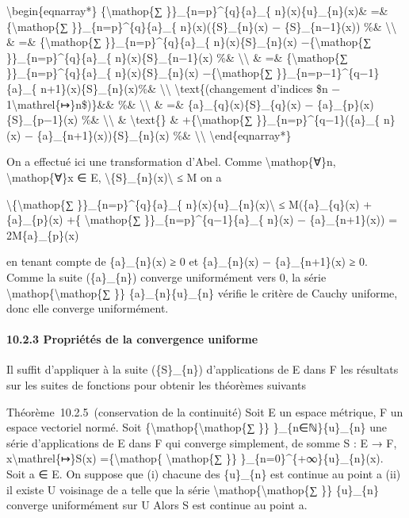 \documentclass[]{article}
\begin{document}
\textbackslash{}begin\{eqnarray*\} \{\textbackslash{}mathop\{∑
\}\}\_\{n=p\}\^{}\{q\}\{a\}\_\{ n\}(x)\{u\}\_\{n\}(x)\& =\&
\{\textbackslash{}mathop\{∑ \}\}\_\{n=p\}\^{}\{q\}\{a\}\_\{
n\}(x)(\{S\}\_\{n\}(x) − \{S\}\_\{n−1\}(x)) \%\&
\textbackslash{}\textbackslash{} \& =\& \{\textbackslash{}mathop\{∑
\}\}\_\{n=p\}\^{}\{q\}\{a\}\_\{ n\}(x)\{S\}\_\{n\}(x)
−\{\textbackslash{}mathop\{∑ \}\}\_\{n=p\}\^{}\{q\}\{a\}\_\{
n\}(x)\{S\}\_\{n−1\}(x) \%\& \textbackslash{}\textbackslash{} \& =\&
\{\textbackslash{}mathop\{∑ \}\}\_\{n=p\}\^{}\{q\}\{a\}\_\{
n\}(x)\{S\}\_\{n\}(x) −\{\textbackslash{}mathop\{∑
\}\}\_\{n=p−1\}\^{}\{q−1\}\{a\}\_\{ n+1\}(x)\{S\}\_\{n\}(x)\%\&
\textbackslash{}\textbackslash{} \textbackslash{}text\{(changement
d'indices \$n − 1\textbackslash{}mathrel\{↦\}n\$)\}\&\& \%\&
\textbackslash{}\textbackslash{} \& =\& \{a\}\_\{q\}(x)\{S\}\_\{q\}(x) −
\{a\}\_\{p\}(x)\{S\}\_\{p−1\}(x) \%\& \textbackslash{}\textbackslash{}
\& \textbackslash{}text\{\} \& +\{\textbackslash{}mathop\{∑
\}\}\_\{n=p\}\^{}\{q−1\}(\{a\}\_\{ n\}(x) −
\{a\}\_\{n+1\}(x))\{S\}\_\{n\}(x) \%\& \textbackslash{}\textbackslash{}
\textbackslash{}end\{eqnarray*\}

On a effectué ici une transformation d'Abel. Comme
\textbackslash{}mathop\{∀\}n, \textbackslash{}mathop\{∀\}x ∈ E,
\textbackslash{}\textbar{}\{S\}\_\{n\}(x)\textbackslash{}\textbar{} ≤ M
on a

\textbackslash{}\textbar{}\{\textbackslash{}mathop\{∑
\}\}\_\{n=p\}\^{}\{q\}\{a\}\_\{
n\}(x)\{u\}\_\{n\}(x)\textbackslash{}\textbar{} ≤
M(\textbar{}\{a\}\_\{q\}(x)\textbar{} +
\textbar{}\{a\}\_\{p\}(x)\textbar{} +\{ \textbackslash{}mathop\{∑
\}\}\_\{n=p\}\^{}\{q−1\}\textbar{}\{a\}\_\{ n\}(x) −
\{a\}\_\{n+1\}(x)\textbar{}) = 2M\{a\}\_\{p\}(x)

en tenant compte de \{a\}\_\{n\}(x) ≥ 0 et \{a\}\_\{n\}(x) −
\{a\}\_\{n+1\}(x) ≥ 0. Comme la suite (\{a\}\_\{n\}) converge
uniformément vers 0, la série
\textbackslash{}mathop\{\textbackslash{}mathop\{∑ \}\}
\{a\}\_\{n\}\{u\}\_\{n\} vérifie le critère de Cauchy uniforme, donc
elle converge uniformément.

\paragraph{10.2.3 Propriétés de la convergence uniforme}

Il suffit d'appliquer à la suite (\{S\}\_\{n\}) d'applications de E dans
F les résultats sur les suites de fonctions pour obtenir les théorèmes
suivants

Théorème~10.2.5~(conservation de la continuité) Soit E un espace
métrique, F un espace vectoriel normé. Soit
\{\textbackslash{}mathop\{\textbackslash{}mathop\{∑ \}\}
\}\_\{n∈ℕ\}\{u\}\_\{n\} une série d'applications de E dans F qui
converge simplement, de somme S : E → F,
x\textbackslash{}mathrel\{↦\}S(x) =\{\textbackslash{}mathop\{
\textbackslash{}mathop\{∑ \}\} \}\_\{n=0\}\^{}\{+∞\}\{u\}\_\{n\}(x).
Soit a ∈ E. On suppose que (i) chacune des \{u\}\_\{n\} est continue au
point a (ii) il existe U voisinage de a telle que la série
\textbackslash{}mathop\{\textbackslash{}mathop\{∑ \}\} \{u\}\_\{n\}
converge uniformément sur U Alors S est continue au point a.
\end{document}
